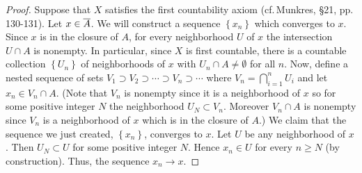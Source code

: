 \begin{proof}
Suppose that $X$ satisfies the first countability axiom
(cf.\,Munkres, \S21, pp.\,130-131). Let $x\in\overline{A}$. We will
construct a sequence $\left\{x_n\right\}$ which converges to
$x$. Since $x$ is in the closure of $A$, for every neighborhood
$U$ of $x$ the intersection $U\cap A$ is nonempty. In particular,
since $X$ is first countable, there is a countable collection
$\left\{U_n\right\}$ of neighborhoods of $x$ with $U_n\cap
A\neq\emptyset$ for all $n$. Now, define a nested sequence of
sets $V_1\supset V_2\supset\cdots\supset V_n\supset\cdots$ where
$V_n=\bigcap_{i=1}^n U_i$ and let $x_n\in V_n\cap A$. (Note that
$V_n$ is nonempty since it is a neighborhood of $x$ so for some
positive integer $N$ the neighborhood $U_N\subset V_n$. Moreover
$V_n\cap A$ is nonempty since $V_n$ is a neighborhood of $x$
which is in the closure of $A$.) We claim that the sequence we
just created, $\left\{x_n\right\}$, converges to $x$. Let $U$ be
any neighborhood of $x$. Then $U_N\subset U$ for some positive
integer $N$. Hence $x_n\in U$ for every $n\geq N$ (by
construction). Thus, the sequence $x_n\to x$.
\end{proof}

